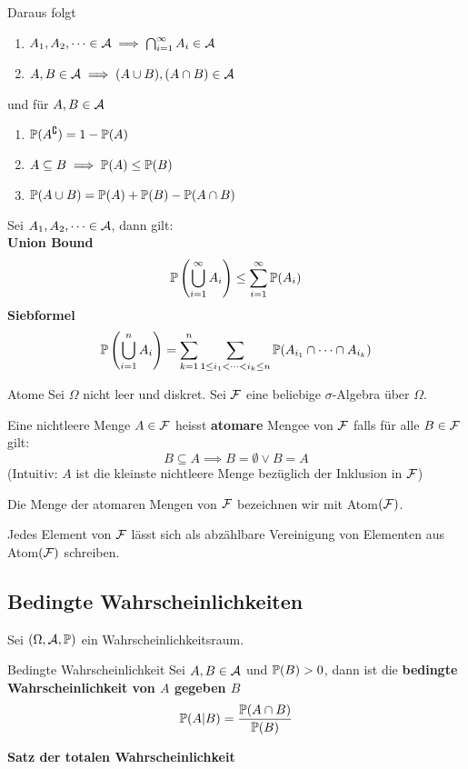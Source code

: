 Daraus folgt
\begin{enumerate}[label=\arabic*.]
    \item $A_1,A_2, \dots \in \A \implies \bigcap_{i=1}^{\infty}A_i \in \A$
    \item $A,B \in \A \implies (A \cup B), (A \cap B) \in \A$
\end{enumerate}
und für $A, B \in \A$
\begin{enumerate}[label=\arabic*.]
    \item $\P(A^\complement) = 1 - \P(A)$
    \item $A \subseteq B \implies \P(A) \leq \P(B)$
    \item $\P(A \cup B) = \P(A)+\P(B)-\P(A \cap B)$
\end{enumerate}
Sei $A_1,A_2, \dots \in \A$, dann gilt:\\
\textbf{Union Bound}
    $$\P\left(\bigcup_{i=1}^{\infty} A_i \right) \leq \sum_{i=1}^{\infty}\P(A_i)$$
\textbf{Siebformel}
    $$\P\left(\bigcup_{i=1}^{n}A_i\right) = \sum_{k = 1}^{n}\sum_{1\leq i_1 < \dots < i_k \leq n} \P(A_{i_1} \cap \dots \cap A_{i_k})$$

    \begin{subbox}{Atome}
        Sei $\Omega$ nicht leer und diskret. Sei $\F$ eine beliebige $\sigma$-Algebra über $\Omega$. 
    
        Eine nichtleere Menge $A \in \F$ heisst \textbf{atomare} Mengee von $\F$ falls für alle $B \in \F$ gilt:
        $$B \subseteq A \implies B = \emptyset \lor B = A$$
        (Intuitiv: $A$ ist die kleinste nichtleere Menge bezüglich der Inklusion in $\F$)
    
        Die Menge der atomaren Mengen von $\F$ bezeichnen wir mit Atom$(\F)$.
    
        Jedes Element von $\F$ lässt sich als abzählbare Vereinigung von Elementen aus Atom$(\F)$ schreiben.
    \end{subbox}
    
\subsection{Bedingte Wahrscheinlichkeiten}
 Sei $(\Omega, \A, \P)$ ein Wahrscheinlichkeitsraum.
 \begin{mainbox}{Bedingte Wahrscheinlichkeit}
    Sei $A, B \in \A$ und $\P(B) > 0$, dann ist die \textbf{bedingte Wahrscheinlichkeit von $A$ gegeben $B$}
    $$\P(A|B) = \frac{\P(A \cap B)}{\P(B)}$$
 \end{mainbox}
\textbf{Satz der totalen Wahrscheinlichkeit}

